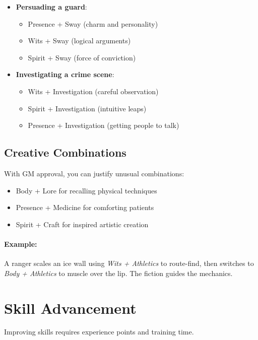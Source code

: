 \begin{multicols}{2}
\begin{itemize}
\item \textbf{Persuading a guard}:
  \begin{itemize}
  \item Presence + Sway (charm and personality)
  \item Wits + Sway (logical arguments)
  \item Spirit + Sway (force of conviction)
  \end{itemize}

\item \textbf{Investigating a crime scene}:
  \begin{itemize}
  \item Wits + Investigation (careful observation)
  \item Spirit + Investigation (intuitive leaps)
  \item Presence + Investigation (getting people to talk)
  \end{itemize}
\end{itemize}

\subsection*{Creative Combinations}
With GM approval, you can justify unusual combinations:
\begin{itemize}
\item Body + Lore for recalling physical techniques
\item Presence + Medicine for comforting patients
\item Spirit + Craft for inspired artistic creation
\end{itemize}

\paragraph{Example:}
A ranger scales an ice wall using \emph{Wits + Athletics} to route-find, then switches to \emph{Body + Athletics} to muscle over the lip. The fiction guides the mechanics.

\section{Skill Advancement}

Improving skills requires experience points and training time.


\end{multicols}

